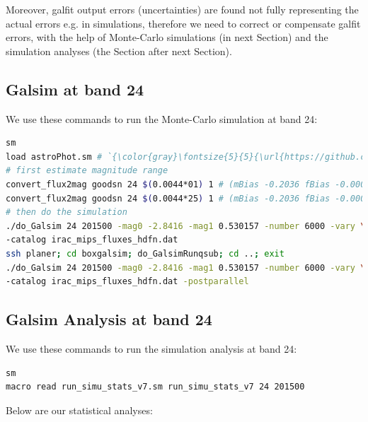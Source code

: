 \documentclass[11pt,a4paper]{article}
\begin{document}
Moreover, galfit output errors (uncertainties) are found not 
fully representing the actual errors e.g. in simulations, 
therefore we need to correct or compensate galfit errors, 
with the help of Monte-Carlo simulations (in next Section) and the simulation analyses (the Section after next Section). 




\subsection{Galsim at band 24}

We use these commands to run the Monte-Carlo simulation at band 24:

\begin{lstlisting}[language=bash]
sm
load astroPhot.sm # `{\color{gray}\fontsize{5}{5}{\url{https://github.com/1054/DeepFields.SuperDeblending/blob/master/Softwares/Supermongo_macro/astroPhot.sm}}}`
# first estimate magnitude range
convert_flux2mag goodsn 24 $(0.0044*01) 1 # (mBias -0.2036 fBias -0.000553)
convert_flux2mag goodsn 24 $(0.0044*25) 1 # (mBias -0.2036 fBias -0.000553)
# then do the simulation
./do_Galsim 24 201500 -mag0 -2.8416 -mag1 0.530157 -number 6000 -vary \
-catalog irac_mips_fluxes_hdfn.dat
ssh planer; cd boxgalsim; do_GalsimRunqsub; cd ..; exit
./do_Galsim 24 201500 -mag0 -2.8416 -mag1 0.530157 -number 6000 -vary \
-catalog irac_mips_fluxes_hdfn.dat -postparallel
\end{lstlisting}

\subsection{Galsim Analysis at band 24}

We use these commands to run the simulation analysis at band 24:

\begin{lstlisting}[language=bash]
sm
macro read run_simu_stats_v7.sm run_simu_stats_v7 24 201500
\end{lstlisting}

Below are our statistical analyses:
\end{document}
